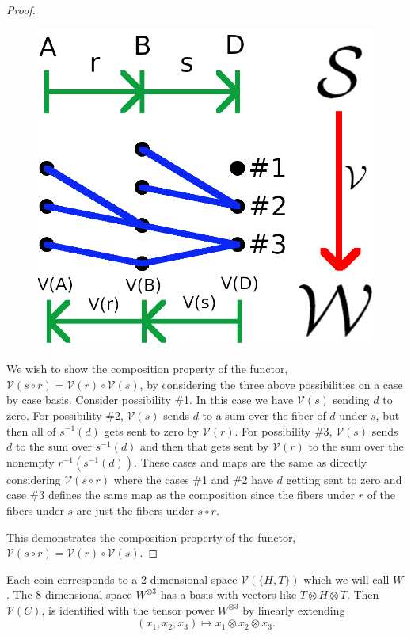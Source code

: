 \documentclass[12pt,a4paper]{article}
\theoremstyle{myrule}
\theoremstyle{postulate}
\theoremstyle{definition}
\begin{document}
\begin{proof}
\begin{figure}[h]
\centering
\includegraphics[scale=1.0]{functor.png}
\end{figure}
  
  We wish to show the composition property of the functor, $\mathcal{V}(s \circ r) = \mathcal{V}(r) \circ \mathcal{V}(s)$, by considering the three above possibilities on a case by case basis.  Consider possibility \#1.  In this case we have $\mathcal{V}(s)$ sending $d$ to zero.  For possibility \#2, $\mathcal{V}(s)$ sends $d$ to a sum over the fiber of $d$ under $s$, but then all of $s^{-1}(d)$ gets sent to zero by $\mathcal{V}(r)$.  For possibility \#3, $\mathcal{V}(s)$ sends $d$ to the sum over $s^{-1}(d)$ and then that gets sent by $\mathcal{V}(r)$ to the sum over the nonempty $r^{-1}(s^{-1}(d))$.  These cases and maps are the same as directly considering $\mathcal{V}(s \circ r)$ where the cases \#1 and \#2 have $d$ getting sent to zero and case \#3 defines the same map as the composition since the fibers under $r$ of the fibers under $s$ are just the fibers under $s \circ r$.

  This demonstrates the composition property of the functor, $\mathcal{V}(s \circ r) = \mathcal{V}(r) \circ \mathcal{V}(s)$.
\end{proof}

Each coin corresponds to a 2 dimensional space $\mathcal{V}(\{H,T\})$ which we will call $W$.  The 8 dimensional space $W ^ {\otimes 3}$ has a basis with vectors like $T \otimes H \otimes T$.  Then $\mathcal{V}(C)$, is identified with the tensor power $W^{\otimes 3}$ by linearly extending
\[
(x_1,x_2,x_3) \mapsto x_1 \otimes x_2 \otimes x_3.
\]
\end{document}
